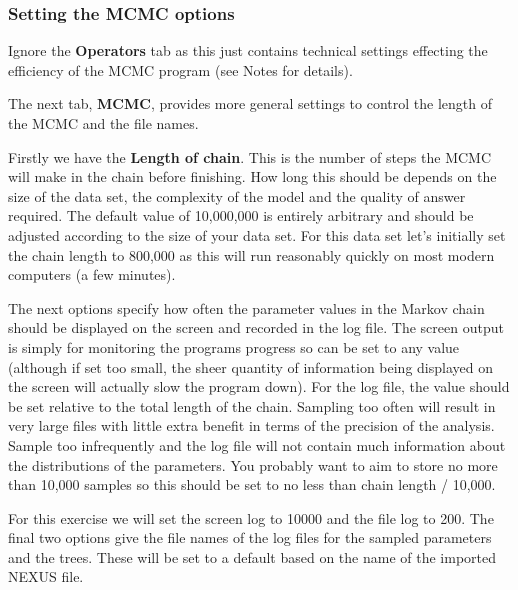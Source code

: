 \documentclass[12pt]{article}
\begin{document}
\medskip{}

\subsubsection*{Setting the MCMC options }

Ignore the \textbf{Operators} tab as this just contains technical
settings effecting the efficiency of the MCMC program (see Notes for details). 

The next tab, {\bf MCMC}, provides more general
settings to control the length of the MCMC and the file names. 

Firstly we have the \textbf{Length of chain}. This is the number of
steps the MCMC will make in the chain before finishing. How long this
should be depends on the size of the data set, the complexity of the
model and the quality of answer required. The default value of 10,000,000
is entirely arbitrary and should be adjusted according to the size
of your data set. For this data set let's initially set the chain
length to 800,000 as this will run reasonably quickly on most modern
computers (a few minutes).

The next options specify how often the parameter values in the Markov
chain should be displayed on the screen and recorded in the log file.
The screen output is simply for monitoring the programs progress so
can be set to any value (although if set too small, the sheer quantity
of information being displayed on the screen will actually slow the
program down). For the log file, the value should be set relative
to the total length of the chain. Sampling too often will result in
very large files with little extra benefit in terms of the precision
of the analysis. Sample too infrequently and the log file will not
contain much information about the distributions of the parameters. 
You probably want to aim to store no more than 10,000 samples so this should be
set to no less than chain length / 10,000.

For this exercise we will set the screen log to 10000 and the file log to 200. The final two
options give the file names of the log files for the sampled parameters and
the trees. These will be set to a default based on the name of the
imported NEXUS file. 

\medskip{}
\end{document}
